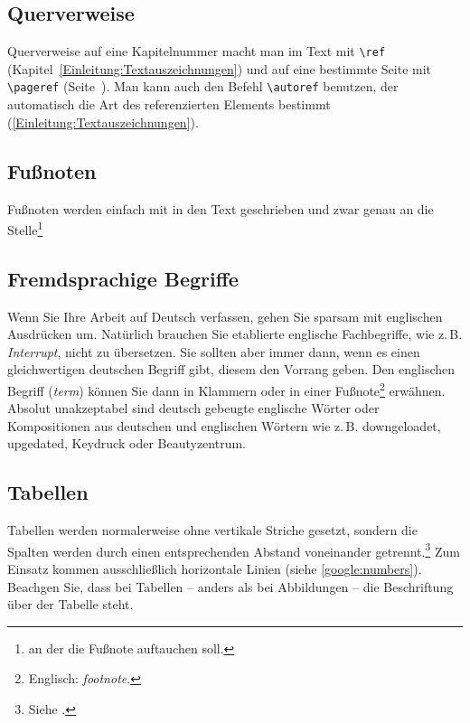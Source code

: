 \documentclass[conference,compsoc,final,a4paper]{IEEEtran}
\begin{document}
\subsection{Querverweise}
Querverweise auf eine Kapitelnummer macht man im Text mit \lstinline+\ref+ (Kapitel~\ref{Einleitung:Textauszeichnungen}) und auf eine bestimmte Seite mit \lstinline+\pageref+ (Seite~\pageref{Einleitung:Textauszeichnungen}). Man kann auch den Befehl \lstinline+\autoref+ benutzen, der automatisch die Art des referenzierten Elements bestimmt (\zb \autoref{Einleitung:Textauszeichnungen}).

\subsection{Fußnoten}
Fußnoten werden einfach mit in den Text geschrieben und zwar genau an die Stelle\footnote{an der die Fußnote auftauchen soll.}

\subsection{Fremdsprachige Begriffe}
Wenn Sie Ihre Arbeit auf Deutsch verfassen, gehen Sie sparsam mit englischen Ausdrücken um. Natürlich brauchen Sie etablierte englische Fachbegriffe, wie z.\,B. \textit{Interrupt}, nicht zu übersetzen. Sie sollten aber immer dann, wenn es einen gleichwertigen deutschen Begriff gibt, diesem den Vorrang geben. Den englischen Begriff (\textit{term}) können Sie dann in Klammern oder in einer Fußnote\footnote{Englisch: \textit{footnote}.} erwähnen. Absolut unakzeptabel sind deutsch gebeugte englische Wörter oder Kompositionen aus deutschen und englischen Wörtern wie z.\,B. downgeloadet, upgedated, Keydruck oder Beautyzentrum.

\subsection{Tabellen}
Tabellen werden normalerweise ohne vertikale Striche gesetzt, sondern die Spalten werden durch einen entsprechenden Abstand voneinander getrennt.\footnote{Siehe \cite[S. 89]{Willberg1999}.} Zum Einsatz kommen ausschließlich horizontale Linien (siehe \autoref{google:numbers}). Beachgen Sie, dass bei Tabellen -- anders als bei Abbildungen -- die Beschriftung über der Tabelle steht.
\end{document}

